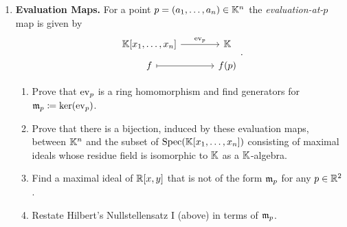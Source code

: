 \documentclass[12pt,reqno]{amsart}
\begin{document}
\begin{enumerate}[leftmargin=*]

\item \textbf{Evaluation Maps.} For a point $p=(a_1,\ldots,a_n) \in \mathbb{K}^n$ the \emph{evaluation-at-$p$} map is given by
\[
\begin{tikzcd}[row sep =.5em, column sep = 3.5em]
	\KK[x_1,\ldots,x_n] \arrow[r, "\ev_p"] & \KK \\
	f \arrow[r, mapsto] & f(p)
\end{tikzcd}.
\]
\begin{enumerate}[label=(\alph*),ref=\theenumi\alph*]
	\item Prove that $\operatorname{ev}_p$ is a ring homomorphism and find generators for $\mathfrak{m}_{p}\coloneqq \ker(\operatorname{ev}_p)$. 
	\item Prove that there is a bijection, induced by these evaluation maps, between $\mathbb{K}^{n}$ and the subset of $\operatorname{Spec}(\mathbb{K}[x_1,\ldots,x_n])$ consisting of maximal ideals whose residue field is isomorphic to $\mathbb{K}$ as a $\mathbb{K}$-algebra. 
	\item Find a maximal ideal of $\mathbb{R}[x,y]$ that is not of the form $\mathfrak{m}_p$ for any $p\in \mathbb{R}^{2}$. 
	\item Restate Hilbert's Nullstellensatz I (above) in terms of $\mathfrak{m}_p$. 
\end{enumerate}


\end{enumerate}
\end{document}

